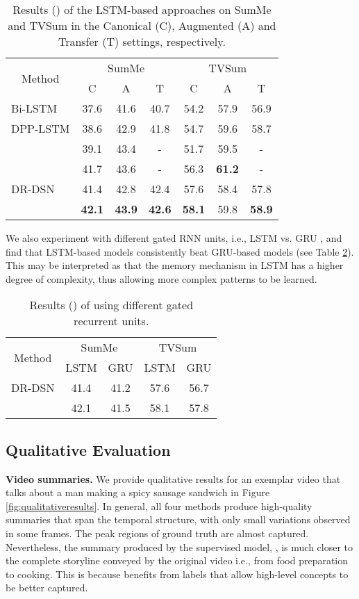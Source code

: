 \documentclass[letterpaper]{article} \usepackage{aaai18}  \usepackage{times}  \usepackage{helvet}  \usepackage{courier}  \usepackage{url}  \usepackage{graphicx}
\begin{document}
\begin{table}[h]
\centering
\caption{Results () of the LSTM-based approaches on SumMe and TVSum in the Canonical (C), Augmented (A) and Transfer (T) settings, respectively.}
\label{tb:resOfAugTran}
\begin{tabular}{l | c | c | c | c | c | c}
\hline
\multicolumn{1}{c|}{\multirow{2}{*}{Method}} & \multicolumn{3}{c|}{SumMe} & \multicolumn{3}{c}{TVSum} \\ \cline{2-7} 
\multicolumn{1}{c|}{} & C & A & T & C & A & T \\ 
\hline
Bi-LSTM & 37.6 & 41.6 & 40.7 & 54.2 & 57.9 & 56.9 \\
DPP-LSTM & 38.6 & 42.9 & 41.8 & 54.7 & 59.6 & 58.7 \\
 & 39.1 & 43.4 & - & 51.7 & 59.5 & - \\
 & 41.7 & 43.6 & - & 56.3 & {\bf 61.2} & - \\
\hline \hline
DR-DSN & 41.4 & 42.8 & 42.4 & 57.6 & 58.4 & 57.8 \\
 & {\bf 42.1} & {\bf 43.9} & {\bf 42.6} & {\bf 58.1} & 59.8 & {\bf 58.9} \\ 
\hline
\end{tabular}
\end{table}

We also experiment with different gated RNN units, i.e., LSTM vs. GRU \cite{cho2014properties}, and find that LSTM-based models consistently beat GRU-based models (see Table \ref{tb:lstmgru}). This may be interpreted as that the memory mechanism in LSTM has a higher degree of complexity, thus allowing more complex patterns to be learned.

\begin{table}[h]
\centering
\caption{Results () of using different gated recurrent units.}
\label{tb:lstmgru}
\begin{tabular}{l | c | c | c | c}
\hline
\multicolumn{1}{c|}{\multirow{2}{*}{Method}} & \multicolumn{2}{c|}{SumMe} & \multicolumn{2}{c}{TVSum} \\ \cline{2-5} 
\multicolumn{1}{c|}{} & LSTM & GRU & LSTM & GRU \\ \hline
DR-DSN & 41.4 & 41.2 & 57.6 & 56.7 \\ \hline
 & 42.1 & 41.5 & 58.1 & 57.8 \\ \hline
\end{tabular}
\end{table}

\subsection{Qualitative Evaluation}
{\bf Video summaries.} We provide qualitative results for an exemplar video that talks about a man making a spicy sausage sandwich in Figure \ref{fig:qualitativeresults}. In general, all four methods produce high-quality summaries that span the temporal structure, with only small variations observed in some frames. The peak regions of ground truth are almost captured. Nevertheless, the summary produced by the supervised model, , is much closer to the complete storyline conveyed by the original video i.e., from food preparation to cooking. This is because  benefits from labels that allow high-level concepts to be better captured.
\end{document}
